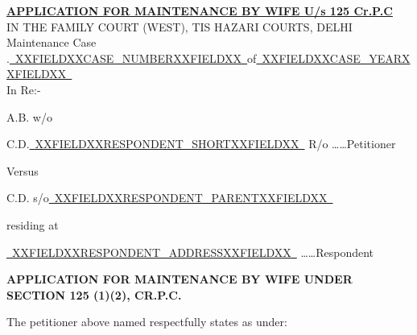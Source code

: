 \documentclass[12pt,a4paper]{article}
\newcommand{\fillline}[1]{\underline{~#1~}}
\begin{document}
\begin{center}
  {\large\bfseries\uline{APPLICATION FOR MAINTENANCE BY WIFE U/s 125 Cr.P.C}}\\[10pt]
  IN THE FAMILY COURT (WEST), TIS HAZARI COURTS, DELHI\\[10pt]
  Maintenance Case .\fillline{XXFIELDXXCASE_NUMBERXXFIELDXX}\quad of\fillline{XXFIELDXXCASE_YEARXXFIELDXX}\\[6pt]
  In Re:-
\end{center}

\vspace{6pt}

A.B. w/o

C.D.\fillline{XXFIELDXXRESPONDENT_SHORTXXFIELDXX} R/o \hfill \ldots\ldots Petitioner

\vspace{4pt}
Versus

\vspace{4pt}
C.D. s/o\fillline{XXFIELDXXRESPONDENT_PARENTXXFIELDXX}

\vspace{4pt}
residing at

\vspace{4pt}
\fillline{XXFIELDXXRESPONDENT_ADDRESSXXFIELDXX} \hfill \ldots\ldots Respondent

\vspace{18pt}

\begin{center}
  \textbf{APPLICATION FOR MAINTENANCE BY WIFE UNDER SECTION 125 (1)(2), CR.P.C.}
\end{center}

The petitioner above named respectfully states as under:

\vspace{6pt}
\end{document}
